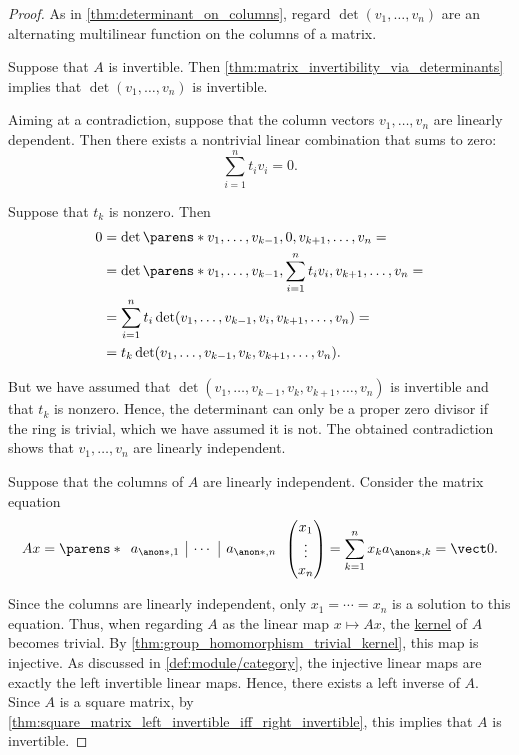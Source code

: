 \begin{proof}
  \SufficiencySubProof As in \cref{thm:determinant_on_columns}, regard \( \det(v_1, \ldots, v_n) \) are an alternating multilinear function on the columns of a matrix.

  Suppose that \( A \) is invertible. Then \cref{thm:matrix_invertibility_via_determinants} implies that \( \det(v_1, \ldots, v_n) \) is invertible.

  Aiming at a contradiction, suppose that the column vectors \( v_1, \ldots, v_n \) are linearly dependent. Then there exists a nontrivial linear combination that sums to zero:
  \begin{equation*}
    \sum_{i=1}^n t_i v_i = 0.
  \end{equation*}

  Suppose that \( t_k \) is nonzero. Then
  \begin{align*}
    0
    &=
    \det\parens*{ v_1, \ldots, v_{k-1}, 0, v_{k+1}, \ldots, v_n }
    = \\ &=
    \det\parens*{ v_1, \ldots, v_{k-1}, \sum_{i=1}^n t_i v_i, v_{k+1}, \ldots, v_n }
    = \\ &=
    \sum_{i=1}^n t_i \det( v_1, \ldots, v_{k-1}, v_i, v_{k+1}, \ldots, v_n )
    = \\ &=
    t_k \det( v_1, \ldots, v_{k-1}, v_k, v_{k+1}, \ldots, v_n ).
  \end{align*}

  But we have assumed that \( \det( v_1, \ldots, v_{k-1}, v_k, v_{k+1}, \ldots, v_n ) \) is invertible and that \( t_k \) is nonzero. Hence, the determinant can only be a proper zero divisor if the ring is trivial, which we have assumed it is not. The obtained contradiction shows that \( v_1, \ldots, v_n \) are linearly independent.

  \NecessitySubProof Suppose that the columns of \( A \) are linearly independent. Consider the matrix equation
  \begin{equation*}
    Ax
    =
    \parens*
    {
      \begin{array}{c|c|c}
        a_{\anon*,1} & \cdots & a_{\anon*,n}
      \end{array}
    }
    \begin{pmatrix}
      x_1 \\ \vdots \\ x_n
    \end{pmatrix}
    =
    \sum_{k=1}^n x_k a_{\anon*,k}
    =
    \vect 0.
  \end{equation*}

  Since the columns are linearly independent, only \( x_1 = \cdots = x_n \) is a solution to this equation. Thus, when regarding \( A \) as the linear map \( x \mapsto Ax \), the \hyperref[def:module/kernel]{kernel} of \( A \) becomes trivial. By \cref{thm:group_homomorphism_trivial_kernel}, this map is injective. As discussed in \cref{def:module/category}, the injective linear maps are exactly the left invertible linear maps. Hence, there exists a left inverse of \( A \). Since \( A \) is a square matrix, by \cref{thm:square_matrix_left_invertible_iff_right_invertible}, this implies that \( A \) is invertible.
\end{proof}

